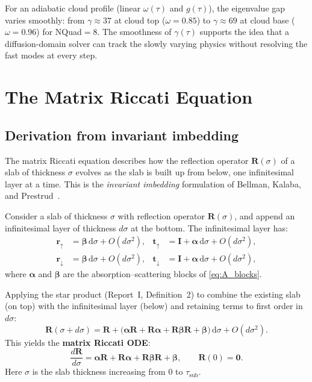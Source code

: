 \documentclass[11pt,a4paper]{article}
\newcommand{\mat}[1]{\mathbf{#1}}
\newcommand{\tsub}{\tau_{\mathrm{sub}}}
\newcommand{\dd}{\,\mathrm{d}}
\theoremstyle{definition}
\begin{document}
For an adiabatic cloud profile (linear $\omega(\tau)$ and $g(\tau)$),
the eigenvalue gap varies smoothly: from $\gamma\approx 37$ at cloud top
($\omega=0.85$) to $\gamma\approx 69$ at cloud base ($\omega=0.96$)
for NQuad${}=8$.  The smoothness of $\gamma(\tau)$ supports the idea
that a diffusion-domain solver can track the slowly varying physics
without resolving the fast modes at every step.


\section{The Matrix Riccati Equation}\label{sec:riccati}

\subsection{Derivation from invariant imbedding}

The matrix Riccati equation describes how the reflection operator
$\mat{R}(\sigma)$ of a slab of thickness $\sigma$ evolves as
the slab is built up from below, one infinitesimal layer at a time.
This is the \emph{invariant imbedding} formulation of
Bellman, Kalaba, and Prestrud~\cite{bellman1960}.

Consider a slab of thickness $\sigma$ with reflection operator
$\mat{R}(\sigma)$, and append an infinitesimal layer of thickness
$d\sigma$ at the bottom.  The infinitesimal layer has:
\begin{align}
  \mat{r}_\uparrow &= \mat{\beta}\dd\sigma + O(d\sigma^2), &
  \mat{t}_\uparrow &= \mat{I} + \mat{\alpha}\dd\sigma + O(d\sigma^2), \\
  \mat{r}_\downarrow &= \mat{\beta}\dd\sigma + O(d\sigma^2), &
  \mat{t}_\downarrow &= \mat{I} + \mat{\alpha}\dd\sigma + O(d\sigma^2),
\end{align}
where $\mat{\alpha}$ and $\mat{\beta}$ are the absorption--scattering
blocks of \eqref{eq:A_blocks}.

Applying the star product (Report~I, Definition~2) to combine the
existing slab (on top) with the infinitesimal layer (below) and
retaining terms to first order in $d\sigma$:
\begin{equation}\label{eq:riccati_derivation}
  \mat{R}(\sigma+d\sigma)
  = \mat{R} + \bigl(\mat{\alpha}\mat{R} + \mat{R}\mat{\alpha}
    + \mat{R}\mat{\beta}\mat{R} + \mat{\beta}\bigr)\dd\sigma
    + O(d\sigma^2).
\end{equation}
This yields the \textbf{matrix Riccati ODE}:
\begin{equation}\label{eq:riccati_pos}
  \boxed{
  \frac{d\mat{R}}{d\sigma}
  = \mat{\alpha}\mat{R} + \mat{R}\mat{\alpha}
    + \mat{R}\mat{\beta}\mat{R} + \mat{\beta},
  \qquad \mat{R}(0)=\mat{0}.
  }
\end{equation}
Here $\sigma$ is the slab thickness increasing from $0$ to $\tsub$.
\end{document}

